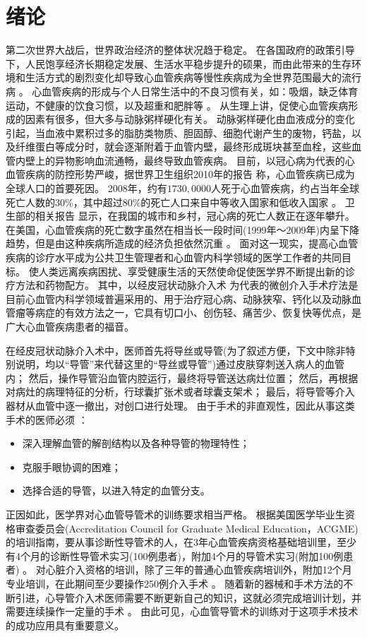 \chapter{绪\;\;\;论}
\label{chap1}

第二次世界大战后，世界政治经济的整体状况趋于稳定。
在各国政府的政策引导下，人民饱享经济长期稳定发展、生活水平稳步提升的硕果，而由此带来的生存环境和生活方式的剧烈变化却导致心血管疾病等慢性疾病成为全世界范围最大的流行病 \cite{Hu2009}。%
心血管疾病的形成与个人日常生活中的不良习惯有关，如：吸烟，缺乏体育运动，不健康的饮食习惯，以及超重和肥胖等 \cite{Go2013}。
从生理上讲，促使心血管疾病形成的因素有很多，但大多与动脉粥样硬化有关。
动脉粥样硬化由血液成分的变化引起，当血液中累积过多的脂肪类物质、胆固醇、细胞代谢产生的废物，钙盐，以及纤维蛋白等成分时，就会逐渐附着于血管内壁，最终形成斑块甚至血栓，这些血管内壁上的异物影响血流通畅，最终导致血管疾病\cite{cvdaha}。
目前，以冠心病为代表的心血管疾病的防控形势严峻，据世界卫生组织2010年的报告 \cite{mho2011}称，心血管疾病已成为全球人口的首要死因。
2008年，约有$1730,0000$人死于心血管疾病，约占当年全球死亡人数的30\%，其中超过80\%的死亡人口来自中等收入国家和低收入国家 \cite{mho2011}。
卫生部的相关报告 \cite{moh2010annual,moh2007annual,moh2004annual}显示，在我国的城市和乡村，冠心病的死亡人数正在逐年攀升。
在美国，心血管疾病的死亡数字虽然在相当长一段时间(1999年～2009年)内呈下降趋势，但是由这种疾病所造成的经济负担依然沉重 \cite{Go2013}。
面对这一现实，提高心血管疾病的诊疗水平成为公共卫生管理者和心血管内科学领域的医学工作者的共同目标。
使人类远离疾病困扰、享受健康生活的天然使命促使医学界不断提出新的诊疗方法和药物配方。
其中，以经皮冠状动脉介入术 \cite{Baim2005}为代表的微创介入手术疗法是目前心血管内科学领域普遍采用的、用于治疗冠心病、动脉狭窄、钙化以及动脉血管瘤等病症的有效方法之一，它具有切口小、创伤轻、痛苦少、恢复快等优点，是广大心血管疾病患者的福音。%

在经皮冠状动脉介入术中，医师首先将导丝或导管(为了叙述方便，下文中除非特别说明，均以“导管”来代替这里的“导丝或导管”)通过皮肤穿刺送入病人的血管内；
然后，操作导管沿血管内腔运行，最终将导管送达病灶位置；
然后，再根据对病灶的病理特征的分析，行球囊扩张术或者球囊支架术；
最后，将导管等介入器材从血管中逐一撤出，对创口进行处理。
由于手术的非直观性，因此从事这类手术的医师必须 \cite{Li2012CUHK}：
\begin{itemize}
  \item 深入理解血管的解剖结构以及各种导管的物理特性；
  \item 克服手眼协调的困难；
  \item 选择合适的导管，以进入特定的血管分支。
\end{itemize}
正因如此，医学界对心血管导管术的训练要求相当严格。
根据美国医学毕业生资格审查委员会(Accreditation Council for Graduate Medical Education，ACGME)的培训指南，要从事诊断性导管术的人，在3年心血管疾病资格基础培训里，至少有4个月的诊断性导管术实习(100例患者)，附加4个月的导管术实习(附加100例患者) \cite{Beller2002CardTraining}。%
对心脏介入资格的培训，除了三年的普通心血管疾病培训外，附加12个月专业培训，在此期间至少要操作250例介入手术 \cite{Beller2002CardTraining,Hirshfeld1999CardTraining}。
随着新的器械和手术方法的不断引进，心导管介入术医师需要不断更新自己的知识，这就必须完成培训计划，并需要连续操作一定量的手术 \cite{Baim2005}。
由此可见，心血管导管术的训练对于这项手术技术的成功应用具有重要意义。

